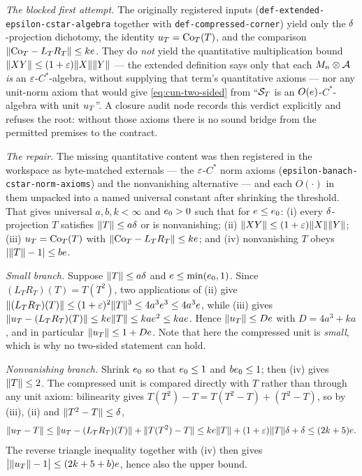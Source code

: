 \emph{The blocked first attempt.} The originally registered inputs
(\texttt{def-extended-epsilon-cstar-algebra} together with
\texttt{def-compressed-corner}) yield only the $\delta$-projection dichotomy, the identity
$u_{T}=\mathrm{Co}_{T}(T)$, and the comparison
$\lVert \mathrm{Co}_{T}-L_TR_T\rVert\le ke$. They do \emph{not} yield the quantitative
multiplication bound $\lVert XY\rVert\le(1+\varepsilon)\lVert X\rVert\lVert Y\rVert$ --- the extended definition says
only that each $M_{n}\otimes \mathcal A$ \emph{is} an $\varepsilon$-$C^*$-algebra, without supplying
that term's quantitative axioms --- nor any unit-norm axiom that would give
\eqref{eq:cun-two-sided} from ``$\mathcal S_{T}$ is an $O(e)$-$C^*$-algebra with unit
$u_{T}$''. A closure audit node records this verdict explicitly and refuses the root:
without those axioms there is no sound bridge from the permitted premises to the
contract.

\emph{The repair.} The missing quantitative content was then registered in the workspace
as byte-matched externals --- the $\varepsilon$-$C^*$ norm axioms
(\texttt{epsilon-banach-cstar-norm-axioms}) and the nonvanishing alternative --- and each
$O(\cdot)$ in them unpacked into a named universal constant after shrinking the
threshold. That gives universal $a,b,k<\infty$ and $e_0>0$ such that for
$e\le e_0$: (i) every $\delta$-projection $T$ satisfies $\lVert T\rVert\le a\delta$ or is
nonvanishing; (ii) $\lVert XY\rVert\le(1+\varepsilon)\lVert X\rVert\lVert Y\rVert$; (iii) $u_{T}=\mathrm{Co}_{T}(T)$ with
$\lVert \mathrm{Co}_{T}-L_TR_T\rVert\le ke$; and (iv) nonvanishing $T$ obeys
$\lvert\lVert T\rVert-1\rvert\le be$.

\emph{Small branch.} Suppose $\lVert T\rVert\le a\delta$ and $e\le\min(e_0,1)$. Since
$(L_TR_T)(T)=T(T^2)$, two applications of (ii) give
$\lVert (L_TR_T)(T)\rVert\le(1+\varepsilon)^2\lVert T\rVert^3\le4a^3e^3\le4a^3e$, while (iii) gives
$\lVert u_{T}-(L_TR_T)(T)\rVert\le ke\lVert T\rVert\le kae^2\le kae$. Hence
$\lVert u_{T}\rVert\le De$ with $D=4a^3+ka$, and in particular
$\lVert u_{T}\rVert\le1+De$. Note that here the compressed unit is \emph{small}, which is
why no two-sided statement can hold.

\emph{Nonvanishing branch.} Shrink $e_0$ so that $e_0\le1$ and $be_0\le1$;
then (iv) gives $\lVert T\rVert\le2$. The compressed unit is compared directly with $T$ rather
than through any unit axiom: bilinearity gives
$T(T^2)-T=T(T^2-T)+(T^2-T)$, so by (iii), (ii) and $\lVert T^2-T\rVert\le\delta$,
\[
  \lVert u_{T}-T\rVert
  \le\lVert u_{T}-(L_TR_T)(T)\rVert+\lVert T(T^2)-T\rVert
  \le ke\lVert T\rVert+(1+\varepsilon)\lVert T\rVert\delta+\delta
  \le(2k+5)e .
\]
The reverse triangle inequality together with (iv) then gives
$\bigl\lvert\lVert u_{T}\rVert-1\bigr\rvert\le(2k+5+b)e$, hence also the upper bound.

